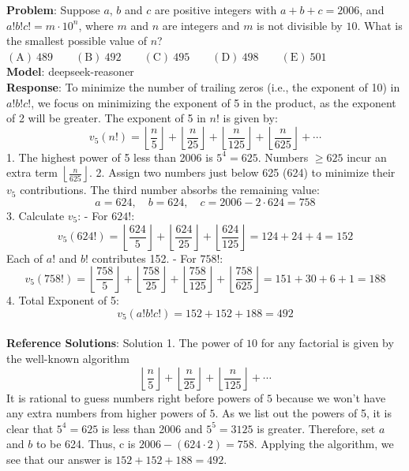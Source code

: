     \textbf{Problem}: Suppose $a$, $b$ and $c$ are positive integers with $a+b+c=2006$, and $a!b!c!=m\cdot 10^n$, where $m$ and $n$ are integers and $m$ is not divisible by $10$. What is the smallest possible value of $n$?
$\mathrm{(A)}\ 489 \qquad \mathrm{(B)}\ 492  \qquad \mathrm{(C)}\ 495 \qquad \mathrm{(D)}\ 498 \qquad \mathrm{(E)}\ 501$ \\
    \textbf{Model}: deepseek-reasoner \\
    \textbf{Response}: To minimize the number of trailing zeros (i.e., the exponent of 10) in \(a!b!c!\), we focus on minimizing the exponent of 5 in the product, as the exponent of 2 will be greater. The exponent of 5 in \(n!\) is given by:
\[
v_5(n!) = \left\lfloor \frac{n}{5} \right\rfloor + \left\lfloor \frac{n}{25} \right\rfloor + \left\lfloor \frac{n}{125} \right\rfloor + \left\lfloor \frac{n}{625} \right\rfloor + \cdots
\]
1. The highest power of 5 less than 2006 is \(5^4 = 625\). Numbers \(\geq 625\) incur an extra term \(\left\lfloor \frac{n}{625} \right\rfloor\).
2. Assign two numbers just below 625 (624) to minimize their \(v_5\) contributions. The third number absorbs the remaining value:
   \[
   a = 624, \quad b = 624, \quad c = 2006 - 2 \cdot 624 = 758
   \]
3. Calculate \(v_5\):
   - For \(624!\):
     \[
     v_5(624!) = \left\lfloor \frac{624}{5} \right\rfloor + \left\lfloor \frac{624}{25} \right\rfloor + \left\lfloor \frac{624}{125} \right\rfloor = 124 + 24 + 4 = 152
     \]
     Each of \(a!\) and \(b!\) contributes 152.
   - For \(758!\):
     \[
     v_5(758!) = \left\lfloor \frac{758}{5} \right\rfloor + \left\lfloor \frac{758}{25} \right\rfloor + \left\lfloor \frac{758}{125} \right\rfloor + \left\lfloor \frac{758}{625} \right\rfloor = 151 + 30 + 6 + 1 = 188
     \]
4. Total Exponent of 5:
   \[
   v_5(a!b!c!) = 152 + 152 + 188 = 492
   \] \\
    \textbf{Reference Solutions}: Solution 1. The power of $10$ for any factorial is given by the well-known algorithm 
\[\left\lfloor \frac n{5}\right\rfloor + \left\lfloor \frac n{25}\right\rfloor + \left\lfloor \frac n{125}\right\rfloor + \cdots\]
It is rational to guess numbers right before powers of $5$ because we won't have any extra numbers from higher powers of $5$. As we list out the powers of 5, it is clear that $5^{4}=625$ is less than 2006 and  $5^{5}=3125$ is greater. Therefore, set $a$ and $b$ to be 624. Thus, c is $2006-(624\cdot 2)=758$. Applying the algorithm, we see that our answer is $152+152+188= \boxed{492}$. \\
    \vspace{0.3cm} \\
